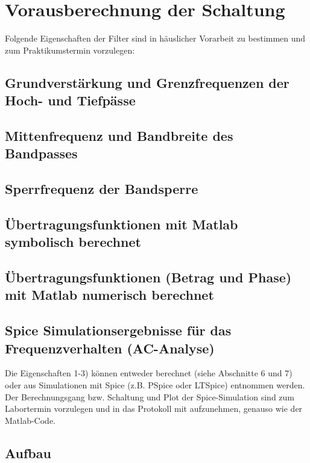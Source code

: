 \section{ Vorausberechnung der Schaltung}

Folgende Eigenschaften der Filter sind in häuslicher Vorarbeit zu bestimmen und zum Praktikumstermin vorzulegen:
\subsection{Grundverstärkung und Grenzfrequenzen der Hoch- und Tiefpässe }
\subsection{Mittenfrequenz und Bandbreite des Bandpasses }
\subsection{Sperrfrequenz der Bandsperre }
\subsection{Übertragungsfunktionen mit Matlab symbolisch berechnet }
\subsection{Übertragungsfunktionen (Betrag und Phase) mit Matlab numerisch berechnet} 
\subsection{Spice Simulationsergebnisse für das Frequenzverhalten (AC-Analyse)}

Die Eigenschaften 1-3) können entweder berechnet (siehe Abschnitte 6 und 7) oder aus Simulationen mit Spice (z.B. PSpice oder LTSpice) entnommen werden. Der Berechnungsgang bzw. Schaltung und Plot der Spice-Simulation sind zum Labortermin vorzulegen und in das Protokoll mit aufzunehmen, genauso wie der Matlab-Code.


\subsection{Aufbau}

